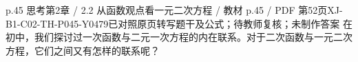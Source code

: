 \par\noindent\begin{minipage}{\linewidth}
\begin{bankitem}{p.45 思考}{第2章 / 2.2 从函数观点看一元二次方程 / 教材 p.45 / PDF 第52页}{XJ-B1-C02-TH-P045-Y0479}{已对照原页转写题干及公式；待教师复核；未制作答案}
在初中，我们探讨过一次函数与二元一次方程的内在联系。对于二次函数与一元二次方程，它们之间又有怎样的联系呢？
\end{bankitem}
\end{minipage}\par\medskip
